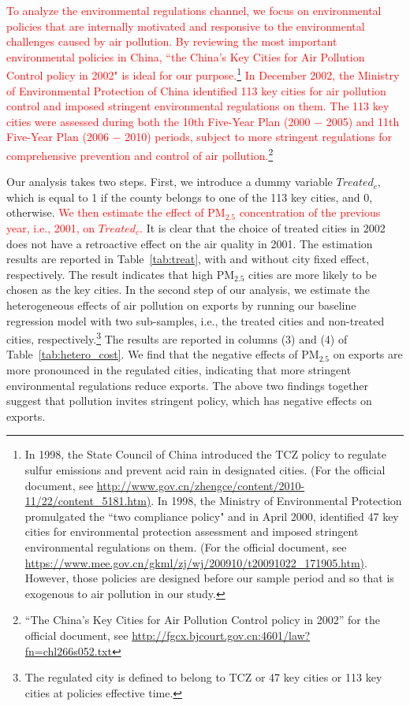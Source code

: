 \documentclass[12pt]{article}
\begin{document}
\textcolor{red}{To analyze the environmental regulations channel, we focus on environmental policies that are internally motivated and responsive to the environmental challenges caused by air pollution. By reviewing the most important environmental policies in China, ``the China’s Key Cities for Air Pollution Control policy in 2002" is ideal for our purpose.\footnote{In 1998, the State Council of China introduced the TCZ policy to regulate sulfur emissions and prevent acid rain in designated cities. (For the official document, see \url{http://www.gov.cn/zhengce/content/2010-11/22/content_5181.htm)}. In 1998, the Ministry of Environmental Protection promulgated the ``two compliance policy" and in April 2000, identified 47 key cities for environmental protection assessment and imposed stringent environmental regulations on them. (For the official document, see \url{https://www.mee.gov.cn/gkml/zj/wj/200910/t20091022_171905.htm)}. However, those policies are designed before our sample period and so that is exogenous to air pollution in our study.} In December 2002, the Ministry of Environmental Protection of China identified 113 key cities for air pollution control and imposed stringent environmental regulations on them. The 113 key cities were assessed during both the 10th Five-Year Plan (2000 $-$ 2005) and 11th Five-Year Plan (2006 $-$ 2010) periods, subject to more stringent regulations for comprehensive prevention and control of air pollution.\footnote{``The China’s
Key Cities for Air Pollution Control policy in 2002” for the official document, see \url{http://fgcx.bjcourt.gov.cn:4601/law?fn=chl266s052.txt}} }

Our analysis takes two steps. First, we introduce a dummy variable $Treated_{c}$, which is equal to 1 if the county belongs to one of the 113 key cities, and 0, otherwise. \textcolor{red}{We then estimate the effect of $\mathrm{PM_{2.5}}$ concentration of the previous year, i.e., 2001, on $Treated_{c}$.} It is clear that the choice of treated cities in 2002 does not have a retroactive effect on the air quality in 2001. The estimation results are reported in Table~\ref{tab:treat}, with and without city fixed effect, respectively. The result indicates that high $\mathrm{PM_{2.5}}$ cities are more likely to be chosen as the key cities. In the second step of our analysis, we estimate the heterogeneous effects of air pollution on exports by running our baseline regression model with two sub-samples, i.e., the treated cities and non-treated cities, respectively.\footnote{The regulated city is defined to belong to TCZ or 47 key cities or 113 key cities at policies effective time.} The results are reported in columns (3) and (4) of Table~\ref{tab:hetero_cost}. We find that the negative effects of $\mathrm{PM_{2.5}}$ on exports are more pronounced
in the regulated cities, indicating that more stringent environmental regulations reduce exports. The above two findings together suggest that pollution invites stringent policy, which has negative effects on exports.
\end{document}
